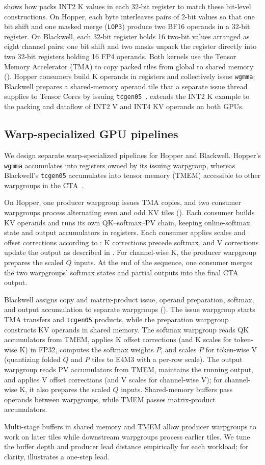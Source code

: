  shows how \sys{} packs INT2 K values in each 32-bit register to match these bit-level constructions.
On Hopper, each byte interleaves pairs of 2-bit values so that one bit shift and one masked merge (\texttt{LOP3}) produce two BF16 operands in a 32-bit register.
On Blackwell, each 32-bit register holds 16 two-bit values arranged as eight channel pairs; one bit shift and two masks unpack the register directly into two 32-bit registers holding 16 FP4 operands.
Both kernels use the Tensor Memory Accelerator (TMA) to copy packed tiles from global to shared memory ().
Hopper consumers build K operands in registers and collectively issue \texttt{wgmma}; Blackwell prepares a shared-memory operand tile that a separate issue thread supplies to Tensor Cores by issuing \texttt{tcgen05}~\cite{nvidia2026ptx}.
 extends the INT2 K example to the packing and dataflow of INT2 V and INT4 KV operands on both GPUs.



\subsection{Warp-specialized GPU pipelines}
\label{sec:design-pipelines}

We design separate warp-specialized pipelines for Hopper and Blackwell.
Hopper's \texttt{wgmma} accumulates into registers owned by its issuing warpgroup, whereas Blackwell's \texttt{tcgen05} accumulates into tensor memory (TMEM) accessible to other warpgroups in the CTA~\cite{nvidia2026ptx}.

On Hopper, one producer warpgroup issues TMA copies, and two consumer warpgroups process alternating even and odd KV tiles ().
Each consumer builds KV operands and runs its own QK--softmax--PV chain, keeping online-softmax state and output accumulators in registers.
Each consumer applies scales and offset corrections according to : K corrections precede softmax, and V corrections update the output as described in .
For channel-wise K, the producer warpgroup prepares the scaled $Q$ inputs.
At the end of the sequence, one consumer merges the two warpgroups' softmax states and partial outputs into the final CTA output.

Blackwell assigns copy and matrix-product issue, operand preparation, softmax, and output accumulation to separate warpgroups ().
The issue warpgroup starts TMA transfers and \texttt{tcgen05} products, while the preparation warpgroup constructs KV operands in shared memory.
The softmax warpgroup reads QK accumulators from TMEM, applies K offset corrections (and K scales for token-wise K) in FP32, computes the softmax weights $P$, and scales $P$ for token-wise V (quantizing folded $Q$ and $P$ tiles to E4M3 with a per-row scale).
The output warpgroup reads PV accumulators from TMEM, maintains the running output, and applies V offset corrections (and V scales for channel-wise V); for channel-wise K, it also prepares the scaled $Q$ inputs.
Shared-memory buffers pass operands between warpgroups, while TMEM passes matrix-product accumulators.

Multi-stage buffers in shared memory and TMEM allow producer warpgroups to work on later tiles while downstream warpgroups process earlier tiles.
We tune the buffer depth and producer lead distance empirically for each workload; for clarity,  illustrates a one-step lead.

